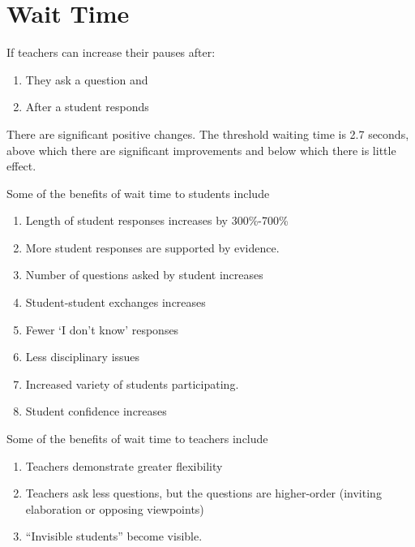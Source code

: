 \documentclass[11pt]{article}
\theoremstyle{theorem}\newtheorem*{task}{Task}
\theoremstyle{theorem}\newtheorem*{example}{Example}
\theoremstyle{definition}\newtheorem*{solution}{Solution}
\theoremstyle{theorem}\newtheorem*{prompt}{Prompt}
\begin{document}
\color{black}

\section{Wait Time}

If teachers can increase their pauses after:
\begin{enumerate}
    \item They ask a question and
    \item After a student responds
\end{enumerate}
There are significant positive changes. The threshold waiting time is 2.7 seconds, above which there are significant improvements and below which there is little effect.

Some of the benefits of wait time to students include
\begin{enumerate}
    \item Length of student responses increases by 300\%-700\%
    \item More student responses are supported by evidence.
    \item Number of questions asked by student increases
    \item Student-student exchanges increases
    \item Fewer `I don't know' responses
    \item Less disciplinary issues
    \item Increased variety of students participating.
    \item Student confidence increases
\end{enumerate}

Some of the benefits of wait time to teachers include
\begin{enumerate}
    \item Teachers demonstrate greater flexibility
    \item Teachers ask less questions, but the questions are higher-order (inviting elaboration or opposing viewpoints)
    \item ``Invisible students'' become visible.
\end{enumerate}
\end{document}
